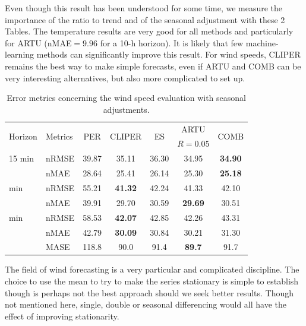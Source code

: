 Even though this result has been understood for some time, we measure the importance of the ratio to trend and of the seasonal adjustment with these 2 Tables. The temperature results are very good for all methods and particularly for ARTU (nMAE$=9.96$ for a 10-h horizon). It is likely that few machine-learning methods can significantly improve this result. For wind speeds, CLIPER remains the best way to make simple forecasts, even if ARTU and COMB can be very interesting alternatives, but also more complicated to set up.

\begin{table} [!htb]
\centering
    \begin{tabular}{@{}llccccc@{}}
    	\toprule
    	\multirow{2}{*}{Horizon} & \multirow{2}{*}{Metrics} & \multirow{2}{*}{PER} & \multirow{2}{*}{CLIPER} & \multirow{2}{*}{ES} &      ARTU      & \multirow{2}{*}{COMB} \\
    	                         &                          &                       &                           &                     &   $R=0.05$   &                       \\ \midrule	
    	15 min                   & nRMSE                    &         39.87         &           35.11           &        36.30        &     34.95      &    \textbf{34.90}     \\ 
    	                         & nMAE                     &         28.64         &           25.41           &        26.14        &     25.30      &    \textbf{25.18}     \\ \addlinespace
    	75 min                   & nRMSE                    &         55.21         &      \textbf{41.32}       &        42.24        &     41.33      &         42.10         \\ 
    	                         & nMAE                     &         39.91         &           29.70           &        30.59        & \textbf{29.69} &         30.51         \\ \addlinespace
    	150 min                  & nRMSE                    &         58.53         &      \textbf{42.07}       &        42.85        &     42.26      &         43.31         \\ 
    	                         & nMAE                     &         42.79         &      \textbf{30.09}       &        30.84        &     30.21      &         31.30         \\ \addlinespace
    	                         & MASE                     &         118.8         &           90.0            &        91.4         & \textbf{89.7}  &         91.7          \\ \bottomrule
    \end{tabular}
\caption{Error metrics concerning the wind speed evaluation with seasonal adjustments.}
\label{tab:8}
\end{table}

The field of wind forecasting is a very particular and complicated discipline. The choice to use the mean to try to make the series stationary is simple to establish though is perhaps not the best approach should we seek better results. Though not mentioned here, single, double or seasonal differencing would all have the effect of improving stationarity.
